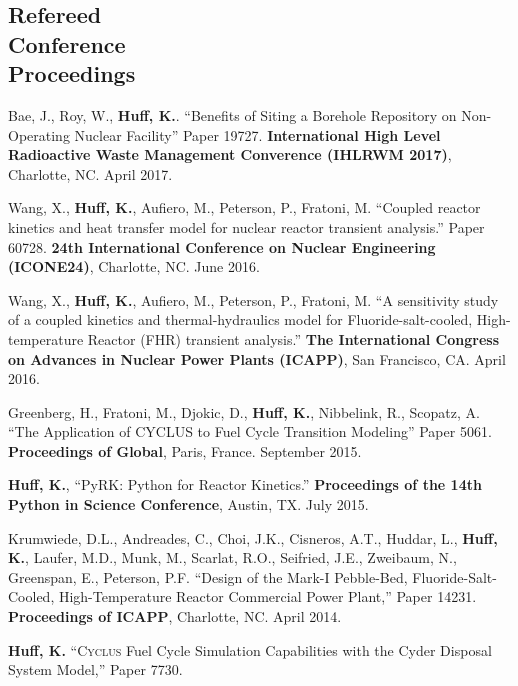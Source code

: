 \documentclass[margin,line]{resume}
\newcommand{\Cyclus}{\textsc{Cyclus}\xspace}%
\begin{document}
\begin{resume}
    \section{\mysidestyle Refereed\\Conference\\Proceedings}
    \begin{bibenum}
      \item Bae, J., Roy, W., \textbf{Huff, K.}.
            ``Benefits of Siting a Borehole Repository on Non-Operating Nuclear 
            Facility'' Paper 19727.  \textbf{International High Level Radioactive 
            Waste Management Converence (IHLRWM 2017)},
            Charlotte, NC. April 2017. 
      \item Wang, X., \textbf{Huff, K.}, Aufiero, M., Peterson, P., Fratoni, M.
            ``Coupled reactor kinetics and heat transfer model for nuclear 
            reactor transient analysis.'' Paper 60728.  \textbf{24th 
            International Conference on Nuclear Engineering (ICONE24)}, 
            Charlotte, NC.  June 2016. 
      \item Wang, X., \textbf{Huff, K.}, Aufiero, M., Peterson, P., Fratoni, M.
            ``A sensitivity study of a coupled kinetics and thermal-hydraulics 
            model for Fluoride-salt-cooled, High-temperature Reactor (FHR) 
            transient analysis.'' \textbf{The International 
            Congress on Advances in Nuclear Power Plants (ICAPP)}, San 
            Francisco, CA. April 2016.
      \item Greenberg, H., Fratoni, M., Djokic, D., \textbf{Huff, K.},
         Nibbelink, R., Scopatz, A. ``The Application of CYCLUS to Fuel Cycle
         Transition Modeling'' Paper 5061.
         \textbf{Proceedings of Global}, Paris, France. September 2015.
      \item \textbf{Huff, K.}, ``PyRK: Python for Reactor Kinetics.''
         \textbf{Proceedings of the 14th Python in Science Conference}, Austin,
         TX. July 2015.
      \item Krumwiede, D.L., Andreades, C., Choi, J.K., Cisneros, A.T., Huddar, L.,
         \textbf{Huff, K.}, Laufer, M.D., Munk, M., Scarlat, R.O., Seifried, J.E.,
         Zweibaum, N., Greenspan, E., Peterson, P.F.  ``Design of the Mark-I
         Pebble-Bed, Fluoride-Salt-Cooled, High-Temperature Reactor Commercial Power
         Plant,'' Paper 14231.  \textbf{Proceedings of ICAPP}, Charlotte, NC. April 2014.
      \item \textbf{Huff, K.} ``\Cyclus Fuel Cycle Simulation Capabilities with the Cyder Disposal System Model,'' Paper 7730.

\end{bibenum}
\end{resume}
\end{document}
